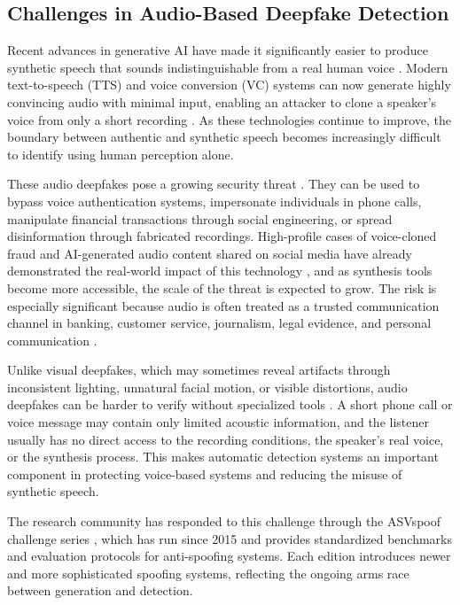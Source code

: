 \documentclass[11pt,a4paper]{article}
\begin{document}
\subsection{Challenges in Audio-Based Deepfake Detection}

Recent advances in generative AI have made it significantly easier to produce
synthetic speech that sounds indistinguishable from a real human voice
\cite{li2024survey,yi2023survey}. Modern text-to-speech (TTS) and voice
conversion (VC) systems can now generate highly convincing audio with minimal
input, enabling an attacker to clone a speaker's voice from only a short
recording \cite{li2025where}. As these technologies continue to improve, the
boundary between authentic and synthetic speech becomes increasingly difficult to
identify using human perception alone.

These audio deepfakes pose a growing security threat
\cite{hong2026vulnerabilities,kamel2025survey}. They can be used to bypass voice
authentication systems, impersonate individuals in phone calls, manipulate
financial transactions through social engineering, or spread disinformation
through fabricated recordings. High-profile cases of voice-cloned fraud and
AI-generated audio content shared on social media have already demonstrated the
real-world impact of this technology \cite{chandra2025deepfake}, and as synthesis
tools become more accessible, the scale of the threat is expected to grow. The
risk is especially significant because audio is often treated as a trusted
communication channel in banking, customer service, journalism, legal evidence,
and personal communication \cite{hong2026vulnerabilities,kamel2025survey}.

Unlike visual deepfakes, which may sometimes reveal artifacts through inconsistent
lighting, unnatural facial motion, or visible distortions, audio deepfakes can be
harder to verify without specialized tools \cite{li2024survey,yi2023survey}. A
short phone call or voice message may contain only limited acoustic information,
and the listener usually has no direct access to the recording conditions, the
speaker's real voice, or the synthesis process. This makes automatic detection
systems an important component in protecting voice-based systems and reducing the
misuse of synthetic speech.

The research community has responded to this challenge through the ASVspoof
challenge series \cite{kinnunen2019asvspoof,wang2024asvspoof5,liu2023asvspoof2021},
which has run since 2015 and provides standardized benchmarks and evaluation
protocols for anti-spoofing systems. Each edition introduces newer and more
sophisticated spoofing systems, reflecting the ongoing arms race between generation
and detection.
\end{document}
